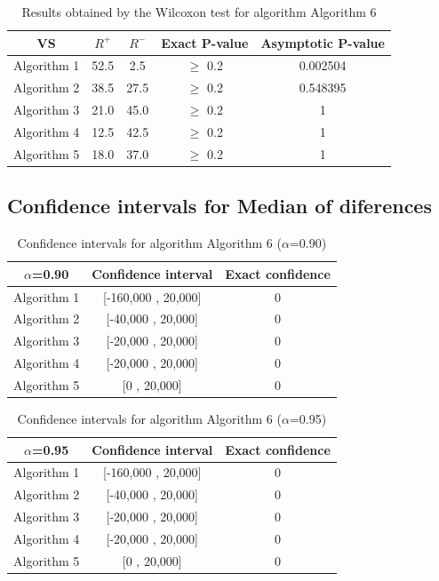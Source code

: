 \documentclass[a4paper,10pt]{article}
\begin{document}
\begin{table}[!htp]
\centering\small
\begin{tabular}{
|c|c|c|c|c|}
\hline
 VS & $R^{+}$ & $R^{-}$ & Exact P-value & Asymptotic P-value \\ \hline 
Algorithm 1 & 52.5 & 2.5 & $\geq$ 0.2 & 0.002504\\ \hline 
Algorithm 2 & 38.5 & 27.5 & $\geq$ 0.2 & 0.548395\\ \hline 
Algorithm 3 & 21.0 & 45.0 & $\geq$ 0.2 & 1\\ \hline 
Algorithm 4 & 12.5 & 42.5 & $\geq$ 0.2 & 1\\ \hline 
Algorithm 5 & 18.0 & 37.0 & $\geq$ 0.2 & 1\\ \hline 

\end{tabular}
\caption{Results obtained by the Wilcoxon test for algorithm Algorithm 6}
\end{table}

\subsection{Confidence intervals for Median of diferences}

\begin{table}[!htp]
\centering\small
\begin{tabular}{
|c|c|c|}
\hline
 $\alpha$=0.90 & Confidence interval & Exact confidence \\ \hline 
Algorithm 1 & [-160,000 , 20,000] & 0\\ \hline 
Algorithm 2 & [-40,000 , 20,000] & 0\\ \hline 
Algorithm 3 & [-20,000 , 20,000] & 0\\ \hline 
Algorithm 4 & [-20,000 , 20,000] & 0\\ \hline 
Algorithm 5 & [0 , 20,000] & 0\\ \hline 

\end{tabular}
\caption{Confidence intervals for algorithm Algorithm 6 ($\alpha$=0.90)}
\end{table}
\begin{table}[!htp]
\centering\small
\begin{tabular}{
|c|c|c|}
\hline
 $\alpha$=0.95 & Confidence interval & Exact confidence \\ \hline 
Algorithm 1 & [-160,000 , 20,000] & 0\\ \hline 
Algorithm 2 & [-40,000 , 20,000] & 0\\ \hline 
Algorithm 3 & [-20,000 , 20,000] & 0\\ \hline 
Algorithm 4 & [-20,000 , 20,000] & 0\\ \hline 
Algorithm 5 & [0 , 20,000] & 0\\ \hline 

\end{tabular}
\caption{Confidence intervals for algorithm Algorithm 6 ($\alpha$=0.95)}
\end{table}

 \clearpage 
\end{document}
